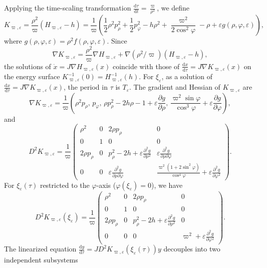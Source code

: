 \documentclass[11pt]{amsart}
\newcommand{\ep}{\varepsilon}
\newcommand{\om}{\varpi}
\begin{document}
Applying the time-scaling transformation $\frac{\mathrm{d}\tau}{\mathrm{d}t}=\frac{\om}{\rho^2}$, we define
\begin{equation}
	K_{\om,\ep}=\frac{\rho^{2}}{\om}(H_{\om,\ep}-h)=\frac{1}{\om}\left(\frac{1}{2}\rho^{2}p_{\rho}^{2}+\frac{1}{2}{p_{\varphi}^{2}}-h\rho^{2}+\frac{\om^{2}}{2\cos^{2}\varphi}-\rho+\ep g(\rho,\varphi,\ep)\right),
\end{equation}
where $g(\rho,\varphi,\ep)=\rho^{2} f(\rho,\varphi,\ep)$. Since  
\begin{equation}
	\nabla K_{\om,\ep}=\frac{\rho^2}{\om}\nabla H_{\om,\ep}+\nabla(\rho^2\slash\om)(H_{\om,\ep}-h),
\end{equation}
the solutions of $\dot{x}=J\nabla H_{\om,\ep}(x)$ coincide with those of $\frac{\mathrm{d}x}{\mathrm{d}\tau}=J\nabla K_{\om,\ep}(x)$ on the energy surface $K_{\om,\ep}^{-1}(0)=H_{\om,\ep}^{-1}(h)$. For $\xi_{\ep}$, as a solution of  $\frac{\mathrm{d}x}{\mathrm{d}\tau}=J\nabla K_{\om,\ep}(x)$, the period in $\tau$ is $T_{\ep}$.
The gradient and Hessian of \(K_{\om,\ep}\) are 
$$
\nabla K_{\om,\ep} = \frac{1}{\om} \left( \rho^2 p_\rho, \, p_\varphi, \, \rho p_\rho^2 - 2h \rho - 1 + \ep \frac{\partial g}{\partial \rho}, \, \frac{\om^2 \sin \varphi}{\cos^3 \varphi} + \ep \frac{\partial g}{\partial \varphi} \right),  
$$ 
and  
$$
D^2 K_{\om,\ep} = \frac{1}{\om} \begin{pmatrix}  
	\rho^2 & 0 & 2 \rho p_\rho & 0 \\  
	0 & 1 & 0 & 0 \\  
	2 \rho p_\rho & 0 & p_\rho^2 - 2h + \ep \frac{\partial^2 g}{\partial \rho^2} & \ep \frac{\partial^2 g}{\partial \rho \partial \varphi} \\  
	0 & 0 & \ep \frac{\partial^2 g}{\partial \rho \partial \varphi} & \frac{\om^2 (1 + 2 \sin^2 \varphi)}{\cos^4 \varphi} + \ep \frac{\partial^2 g}{\partial \varphi^2}  
\end{pmatrix}.  
$$
For $\xi_{\ep}(\tau)$ restricted to the $\varphi$-axis ($\varphi(\xi_{\ep}) = 0$), we have
$$
D^2 K_{\om,\ep}(\xi_{\ep}) = \frac{1}{\om} \begin{pmatrix}  
	\rho^2 & 0 & 2 \rho p_\rho & 0 \\  
	0 & 1 & 0 & 0 \\  
	2 \rho p_\rho & 0 & p_\rho^2 - 2h + \ep \frac{\partial^2 g}{\partial \rho^2} & 0 \\  
	0 & 0 & 0 & \om^2 + \ep \frac{\partial^2 g}{\partial \varphi^2}  
\end{pmatrix}.  
$$ 
The linearized equation $\frac{\mathrm{d}y}{\mathrm{d}\tau}=JD^{2}K_{\om,\ep}(\xi_{\ep}(\tau))y$ decouples into two independent subsystems  
\end{document}
